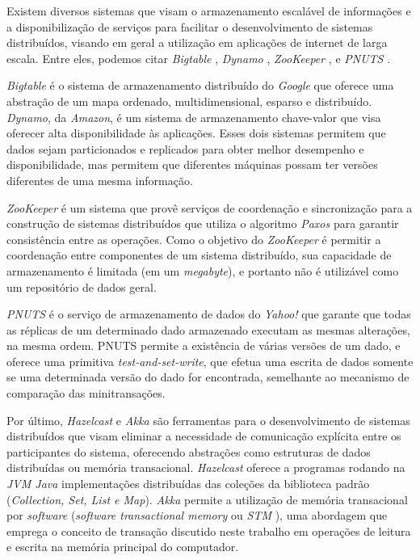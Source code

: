 \documentclass[11pt,twoside,a4paper]{book}
\begin{document}
Existem diversos sistemas que visam o armazenamento escalável de informações e a disponibilização de serviços para facilitar o 
desenvolvimento de sistemas distribuídos, visando em geral a utilização em aplicações de internet de larga escala. Entre eles, 
podemos citar \emph{Bigtable} \cite{bigtable}, \emph{Dynamo} \cite{dynamo},
\emph{ZooKeeper} \cite{zookeeper}, e \emph{PNUTS} \cite{pnuts}.

\emph{Bigtable} é o sistema de armazenamento distribuído do \emph{Google} que
oferece uma abstração de um mapa ordenado, multidimensional, esparso e
distribuído. \emph{Dynamo}, da \emph{Amazon}, é um sistema de armazenamento
chave-valor que visa oferecer alta disponibilidade às aplicações. Esses dois sistemas permitem que dados sejam
particionados e replicados para obter melhor desempenho e disponibilidade, mas
permitem que diferentes máquinas possam ter versões diferentes de uma mesma informação.

\emph{ZooKeeper} é um sistema que provê serviços de coordenação e sincronização
para a construção de sistemas distribuídos que utiliza o algoritmo \emph{Paxos}
\cite{paxos} para garantir consistência entre as operações. Como o objetivo do
\emph{ZooKeeper} é permitir a coordenação entre componentes de um sistema
distribuído, sua capacidade de armazenamento é limitada (em um \emph{megabyte}), e portanto não é utilizável como um 
repositório de dados geral.

\emph{PNUTS} é o serviço de armazenamento de dados do \emph{Yahoo!} que garante
que todas as réplicas de um determinado dado armazenado executam as mesmas alterações, na mesma ordem. PNUTS permite a 
existência de várias versões de um dado, e oferece uma primitiva \emph{test-and-set-write}, que efetua uma escrita de dados 
somente se uma determinada versão do dado for encontrada, semelhante ao mecanismo de comparação das minitransações.

Por último, \emph{Hazelcast} \cite{hazelcast} e \emph{Akka} \cite{akka} são
ferramentas para o desenvolvimento de sistemas distribuídos que visam eliminar a necessidade de comunicação explícita entre os 
participantes do sistema, oferecendo abstrações como estruturas de dados
distribuídas ou memória transacional. \emph{Hazelcast} oferece a programas
rodando na \emph{JVM Java} implementações distribuídas das coleções da biblioteca padrão (\emph{Collection, Set, List e Map}). 
\emph{Akka} permite a utilização de memória transacional por \emph{software}
(\emph{software transactional memory} ou \emph{STM} \cite{stm}), uma abordagem que emprega o conceito de transação discutido 
neste trabalho em operações de leitura e escrita na memória principal do computador.
\end{document}
